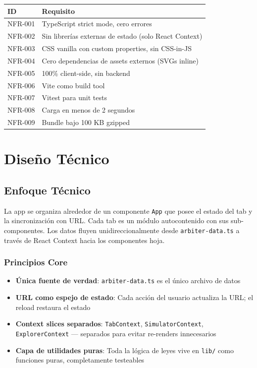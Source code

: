\documentclass[11pt,a4paper]{report}
\begin{document}
\begin{table}[h]
\centering
\small
\begin{tabular}{@{}ll@{}}
\toprule
\textbf{ID} & \textbf{Requisito} \\
\midrule
NFR-001 & TypeScript strict mode, cero errores \\
NFR-002 & Sin librerías externas de estado (solo React Context) \\
NFR-003 & CSS vanilla con custom properties, sin CSS-in-JS \\
NFR-004 & Cero dependencias de assets externos (SVGs inline) \\
NFR-005 & 100\% client-side, sin backend \\
NFR-006 & Vite como build tool \\
NFR-007 & Vitest para unit tests \\
NFR-008 & Carga en menos de 2 segundos \\
NFR-009 & Bundle bajo 100 KB gzipped \\
\bottomrule
\end{tabular}
\end{table}

\cleardoublepage

\chapter{Diseño Técnico}

\section{Enfoque Técnico}

La app se organiza alrededor de un componente \texttt{App} que posee el estado del tab y la sincronización con URL. Cada tab es un módulo autocontenido con sus sub-componentes. Los datos fluyen unidireccionalmente desde \texttt{arbiter-data.ts} a través de React Context hacia los componentes hoja.

\subsection{Principios Core}
\begin{itemize}
  \item \textbf{Única fuente de verdad}: \texttt{arbiter-data.ts} es el único archivo de datos
  \item \textbf{URL como espejo de estado}: Cada acción del usuario actualiza la URL; el reload restaura el estado
  \item \textbf{Context slices separados}: \texttt{TabContext}, \texttt{SimulatorContext}, \texttt{ExplorerContext} — separados para evitar re-renders innecesarios
  \item \textbf{Capa de utilidades puras}: Toda la lógica de leyes vive en \texttt{lib/} como funciones puras, completamente testeables
\end{itemize}
\end{document}
